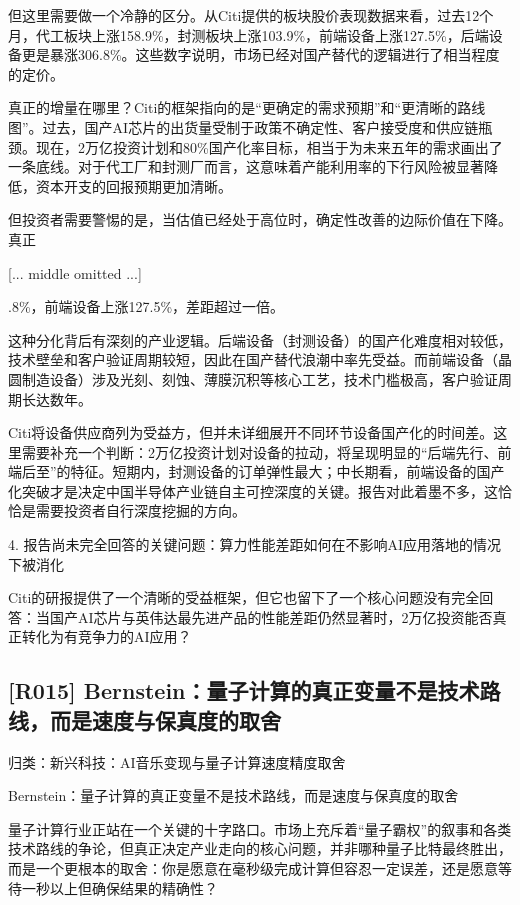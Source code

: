 \documentclass[11pt]{ctexart}
\begin{document}
但这里需要做一个冷静的区分。从Citi提供的板块股价表现数据来看，过去12个月，代工板块上涨158.9\%，封测板块上涨103.9\%，前端设备上涨127.5\%，后端设备更是暴涨306.8\%。这些数字说明，市场已经对国产替代的逻辑进行了相当程度的定价。

真正的增量在哪里？Citi的框架指向的是“更确定的需求预期”和“更清晰的路线图”。过去，国产AI芯片的出货量受制于政策不确定性、客户接受度和供应链瓶颈。现在，2万亿投资计划和80\%国产化率目标，相当于为未来五年的需求画出了一条底线。对于代工厂和封测厂而言，这意味着产能利用率的下行风险被显著降低，资本开支的回报预期更加清晰。

但投资者需要警惕的是，当估值已经处于高位时，确定性改善的边际价值在下降。真正

[... middle omitted ...]

.8\%，前端设备上涨127.5\%，差距超过一倍。

这种分化背后有深刻的产业逻辑。后端设备（封测设备）的国产化难度相对较低，技术壁垒和客户验证周期较短，因此在国产替代浪潮中率先受益。而前端设备（晶圆制造设备）涉及光刻、刻蚀、薄膜沉积等核心工艺，技术门槛极高，客户验证周期长达数年。

Citi将设备供应商列为受益方，但并未详细展开不同环节设备国产化的时间差。这里需要补充一个判断：2万亿投资计划对设备的拉动，将呈现明显的“后端先行、前端后至”的特征。短期内，封测设备的订单弹性最大；中长期看，前端设备的国产化突破才是决定中国半导体产业链自主可控深度的关键。报告对此着墨不多，这恰恰是需要投资者自行深度挖掘的方向。

4. 报告尚未完全回答的关键问题：算力性能差距如何在不影响AI应用落地的情况下被消化

Citi的研报提供了一个清晰的受益框架，但它也留下了一个核心问题没有完全回答：当国产AI芯片与英伟达最先进产品的性能差距仍然显著时，2万亿投资能否真正转化为有竞争力的AI应用？

\subsection{[R015] Bernstein：量子计算的真正变量不是技术路线，而是速度与保真度的取舍}
{\small\color{refgray}归类：新兴科技：AI音乐变现与量子计算速度精度取舍}

Bernstein：量子计算的真正变量不是技术路线，而是速度与保真度的取舍

量子计算行业正站在一个关键的十字路口。市场上充斥着“量子霸权”的叙事和各类技术路线的争论，但真正决定产业走向的核心问题，并非哪种量子比特最终胜出，而是一个更根本的取舍：你是愿意在毫秒级完成计算但容忍一定误差，还是愿意等待一秒以上但确保结果的精确性？
\end{document}
